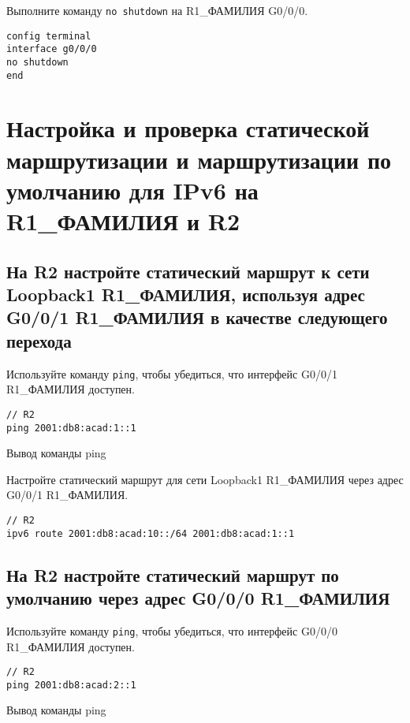Выполните команду \texttt{no shutdown} на R1\_ФАМИЛИЯ G0/0/0.

\begin{verbatim}
config terminal
interface g0/0/0
no shutdown
end
\end{verbatim}

\section{Настройка и проверка статической маршрутизации и
	маршрутизации по умолчанию для IPv6 на R1\_ФАМИЛИЯ и R2}

\subsection{На R2 настройте статический маршрут к сети Loopback1 R1\_ФАМИЛИЯ,
	используя адрес G0/0/1 R1\_ФАМИЛИЯ в качестве следующего перехода}

Используйте команду \texttt{ping}, чтобы убедиться,
что интерфейс G0/0/1 R1\_ФАМИЛИЯ доступен.

\begin{verbatim}
// R2
ping 2001:db8:acad:1::1
\end{verbatim}

\begin{image}
	\caption{Вывод команды ping}
\end{image}

Настройте статический маршрут для сети Loopback1 R1\_ФАМИЛИЯ
через адрес G0/0/1 R1\_ФАМИЛИЯ.

\begin{verbatim}
// R2
ipv6 route 2001:db8:acad:10::/64 2001:db8:acad:1::1
\end{verbatim}

\subsection{На R2 настройте статический маршрут
	по умолчанию через адрес G0/0/0 R1\_ФАМИЛИЯ}

Используйте команду \texttt{ping}, чтобы убедиться,
что интерфейс G0/0/0 R1\_ФАМИЛИЯ доступен.

\begin{verbatim}
// R2
ping 2001:db8:acad:2::1
\end{verbatim}

\begin{image}
	\caption{Вывод команды ping}
\end{image}

